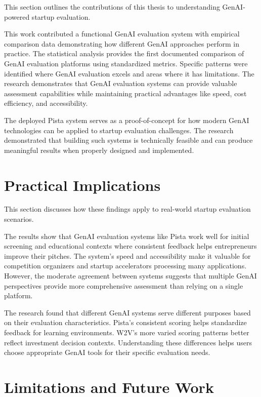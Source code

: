 This section outlines the contributions of this thesis to understanding GenAI-powered startup evaluation.

This work contributed a functional GenAI evaluation system with empirical comparison data demonstrating how different GenAI approaches perform in practice. The statistical analysis provides the first documented comparison of GenAI evaluation platforms using standardized metrics. Specific patterns were identified where GenAI evaluation excels and areas where it has limitations. The research demonstrates that GenAI evaluation systems can provide valuable assessment capabilities while maintaining practical advantages like speed, cost efficiency, and accessibility.

The deployed Pista system serves as a proof-of-concept for how modern GenAI technologies can be applied to startup evaluation challenges. The research demonstrated that building such systems is technically feasible and can produce meaningful results when properly designed and implemented.

\section{Practical Implications}
\label{sec:implications}

This section discusses how these findings apply to real-world startup evaluation scenarios.

The results show that GenAI evaluation systems like Pista work well for initial screening and educational contexts where consistent feedback helps entrepreneurs improve their pitches. The system's speed and accessibility make it valuable for competition organizers and startup accelerators processing many applications. However, the moderate agreement between systems suggests that multiple GenAI perspectives provide more comprehensive assessment than relying on a single platform.

The research found that different GenAI systems serve different purposes based on their evaluation characteristics. Pista's consistent scoring helps standardize feedback for learning environments. W2V's more varied scoring patterns better reflect investment decision contexts. Understanding these differences helps users choose appropriate GenAI tools for their specific evaluation needs.

\section{Limitations and Future Work}
\label{sec:limitations}

